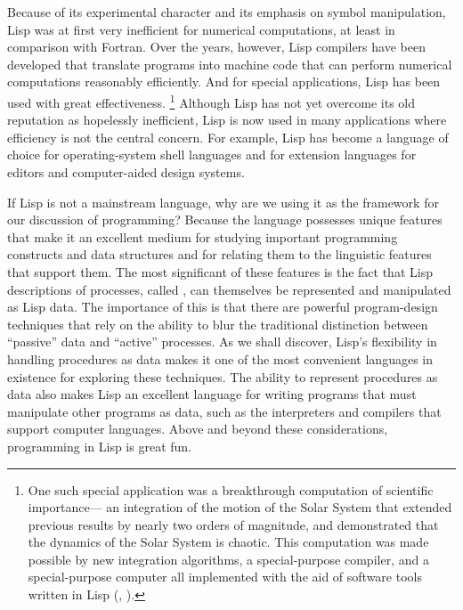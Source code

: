 Because of its experimental character and its emphasis on symbol manipulation, Lisp was at first very inefficient for numerical computations, at least in comparison with Fortran.
Over the years, however, Lisp compilers have been developed that translate programs into machine code that can perform numerical computations reasonably efficiently.
And for special applications, Lisp has been used with great effectiveness.%
\footnote{
	One such special application was a breakthrough computation of scientific importance---%
	an integration of the motion of the Solar System that extended previous results by nearly two orders of magnitude, and demonstrated that the dynamics of the Solar System is chaotic.
	This computation was made possible by new integration algorithms, a special-purpose compiler, and a special-purpose computer all implemented with the aid of software tools written in Lisp (\autocite{abelson_et_al_supercomputer}, ).
}
Although Lisp has not yet overcome its old reputation as hopelessly inefficient, Lisp is now used in many applications where efficiency is not the central concern.
For example, Lisp has become a language of choice for operating-system shell languages and for extension languages for editors and computer-aided design systems.

If Lisp is not a mainstream language, why are we using it as the framework for our discussion of programming?
Because the language possesses unique features that make it an excellent medium for studying important programming constructs and data structures and for relating them to the linguistic features that support them.
The most significant of these features is the fact that Lisp descriptions of processes, called , can themselves be represented and manipulated as Lisp data.
The importance of this is that there are powerful program-design techniques that rely on the ability to blur the traditional distinction between “passive” data and “active” processes.
As we shall discover, Lisp’s flexibility in handling procedures as data makes it one of the most convenient languages in existence for exploring these techniques.
The ability to represent procedures as data also makes Lisp an excellent language for writing programs that must manipulate other programs as data, such as the interpreters and compilers that support computer languages.
Above and beyond these considerations, programming in Lisp is great fun.




